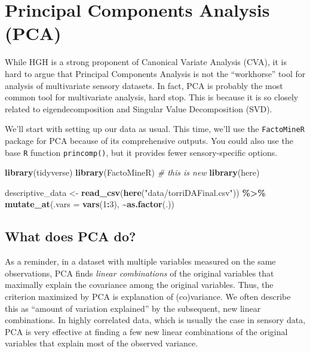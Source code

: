 \documentclass[
]{book}
\newenvironment{Shaded}{\begin{snugshade}}{\end{snugshade}}
\newcommand{\AttributeTok}[1]{\textcolor[rgb]{0.13,0.29,0.53}{#1}}
\newcommand{\CommentTok}[1]{\textcolor[rgb]{0.56,0.35,0.01}{\textit{#1}}}
\newcommand{\DecValTok}[1]{\textcolor[rgb]{0.00,0.00,0.81}{#1}}
\newcommand{\FunctionTok}[1]{\textcolor[rgb]{0.13,0.29,0.53}{\textbf{#1}}}
\newcommand{\NormalTok}[1]{#1}
\newcommand{\OtherTok}[1]{\textcolor[rgb]{0.56,0.35,0.01}{#1}}
\newcommand{\SpecialCharTok}[1]{\textcolor[rgb]{0.81,0.36,0.00}{\textbf{#1}}}
\newcommand{\StringTok}[1]{\textcolor[rgb]{0.31,0.60,0.02}{#1}}
\begin{document}
\chapter{Principal Components Analysis (PCA)}\label{principal-components-analysis-pca}

While HGH is a strong proponent of Canonical Variate Analysis (CVA), it is hard to argue that Principal Components Analysis is not the ``workhorse'' tool for analysis of multivariate sensory datasets. In fact, PCA is probably the most common tool for multivariate analysis, hard stop. This is because it is so closely related to eigendecomposition and Singular Value Decomposition (SVD).

We'll start with setting up our data as usual. This time, we'll use the \texttt{FactoMineR} package for PCA because of its comprehensive outputs. You could also use the base \texttt{R} function \texttt{princomp()}, but it provides fewer sensory-specific options.

\begin{Shaded}
\begin{Highlighting}[]
\FunctionTok{library}\NormalTok{(tidyverse)}
\FunctionTok{library}\NormalTok{(FactoMineR) }\CommentTok{\# this is new}
\FunctionTok{library}\NormalTok{(here)}

\NormalTok{descriptive\_data }\OtherTok{\textless{}{-}} \FunctionTok{read\_csv}\NormalTok{(}\FunctionTok{here}\NormalTok{(}\StringTok{"data/torriDAFinal.csv"}\NormalTok{)) }\SpecialCharTok{\%\textgreater{}\%}
  \FunctionTok{mutate\_at}\NormalTok{(}\AttributeTok{.vars =} \FunctionTok{vars}\NormalTok{(}\DecValTok{1}\SpecialCharTok{:}\DecValTok{3}\NormalTok{), }\SpecialCharTok{\textasciitilde{}}\FunctionTok{as.factor}\NormalTok{(.))}
\end{Highlighting}
\end{Shaded}

\section{What does PCA do?}\label{what-does-pca-do}

As a reminder, in a dataset with multiple variables measured on the same observations, PCA finds \emph{linear combinations} of the original variables that maximally explain the covariance among the original variables. Thus, the criterion maximized by PCA is explanation of (co)variance. We often describe this as ``amount of variation explained'' by the subsequent, new linear combinations. In highly correlated data, which is usually the case in sensory data, PCA is very effective at finding a few new linear combinations of the original variables that explain most of the observed variance.
\end{document}
